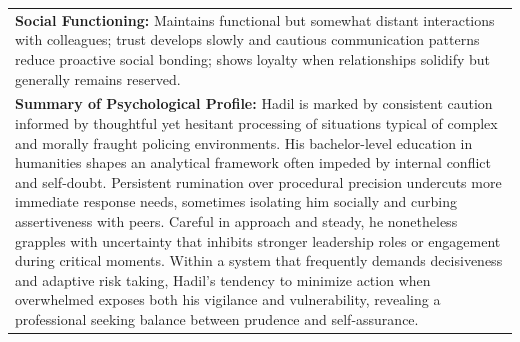 \documentclass[11pt]{article}
\begin{document}
\begin{table}[ht]
\begin{tabularx}{\textwidth}{X}
\textbf{Social Functioning:} Maintains functional but somewhat distant interactions with colleagues; trust develops slowly and cautious communication patterns reduce proactive social bonding; shows loyalty when relationships solidify but generally remains reserved. \\[4pt]

\textbf{Summary of Psychological Profile:} Hadil is marked by consistent caution informed by thoughtful yet hesitant processing of situations typical of complex and morally fraught policing environments. His bachelor-level education in humanities shapes an analytical framework often impeded by internal conflict and self-doubt. Persistent rumination over procedural precision undercuts more immediate response needs, sometimes isolating him socially and curbing assertiveness with peers. Careful in approach and steady, he nonetheless grapples with uncertainty that inhibits stronger leadership roles or engagement during critical moments. Within a system that frequently demands decisiveness and adaptive risk taking, Hadil’s tendency to minimize action when overwhelmed exposes both his vigilance and vulnerability, revealing a professional seeking balance between prudence and self-assurance. \\
\bottomrule
\end{tabularx}
\end{table}
\end{document}

